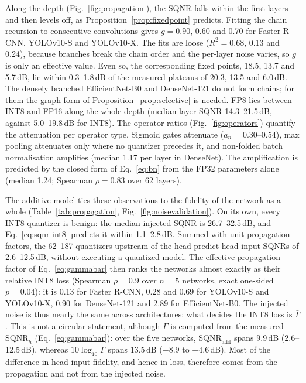 \documentclass[pdflatex,sn-mathphys-num]{sn-jnl}%
\theoremstyle{thmstyleone}%
\theoremstyle{thmstyletwo}%
\theoremstyle{thmstylethree}%
\begin{document}
Along the depth (Fig.~\ref{fig:propagation}), the SQNR falls within the first layers and then levels off, as Proposition~\ref{prop:fixedpoint} predicts. Fitting the chain recursion to consecutive convolutions gives $g=0.90$, 0.60 and 0.70 for Faster R-CNN, YOLOv10-S and YOLOv10-X. The fits are loose ($R^2=0.68$, 0.13 and 0.24), because branches break the chain order and the per-layer noise varies, so $g$ is only an effective value. Even so, the corresponding fixed points, 18.5, 13.7 and 5.7\,dB, lie within 0.3--1.8\,dB of the measured plateaus of 20.3, 13.5 and 6.0\,dB. The densely branched EfficientNet-B0 and DenseNet-121 do not form chains; for them the graph form of Proposition~\ref{prop:selective} is needed. FP8 lies between INT8 and FP16 along the whole depth (median layer SQNR 14.3--21.5\,dB, against 5.0--19.8\,dB for INT8). The operator ratios (Fig.~\ref{fig:operators}) quantify the attenuation per operator type. Sigmoid gates attenuate ($a_n=0.30$--0.54), max pooling attenuates only where no quantizer precedes it, and non-folded batch normalisation amplifies (median 1.17 per layer in DenseNet). The amplification is predicted by the closed form of Eq.~\eqref{eq:bn} from the FP32 parameters alone (median 1.24; Spearman $\rho=0.83$ over 62 layers).

The additive model ties these observations to the fidelity of the network as a whole (Table~\ref{tab:propagation}, Fig.~\ref{fig:noisevalidation}). On its own, every INT8 quantizer is benign: the median injected SQNR is 26.7--32.5\,dB, and Eq.~\eqref{eq:sqnr-int8} predicts it within 1.1--2.8\,dB. Summed with unit propagation factors, the 62--187 quantizers upstream of the head predict head-input SQNRs of 2.6--12.5\,dB, without executing a quantized model. The effective propagation factor of Eq.~\eqref{eq:gammabar} then ranks the networks almost exactly as their relative INT8 loss (Spearman $\rho=0.9$ over $n=5$ networks, exact one-sided $p=0.04$): it is 0.13 for Faster R-CNN, 0.28 and 0.69 for YOLOv10-S and YOLOv10-X, 0.90 for DenseNet-121 and 2.89 for EfficientNet-B0. The injected noise is thus nearly the same across architectures; what decides the INT8 loss is $\bar\Gamma$. This is not a circular statement, although $\bar\Gamma$ is computed from the measured $\mathrm{SQNR}_h$ (Eq.~\eqref{eq:gammabar}): over the five networks, $\mathrm{SQNR}_\text{add}$ spans 9.9\,dB (2.6--12.5\,dB), whereas $10\log_{10}\bar\Gamma$ spans 13.5\,dB ($-8.9$ to $+4.6$\,dB). Most of the difference in head-input fidelity, and hence in loss, therefore comes from the propagation and not from the injected noise.
\end{document}
